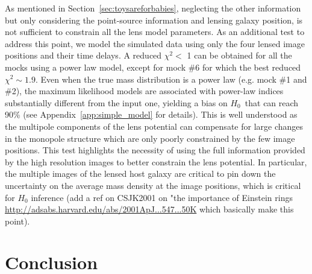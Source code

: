 \documentclass[traditabstract, twocolumns, longauth]{aa}
\newcommand{\Hc}{\ensuremath{H_0}\xspace}
\begin{document}
As mentioned in Section~\ref{sec:toysareforbabies}, neglecting the other information but only considering the point-source information and lensing galaxy position, is not sufficient to constrain all the lens model parameters. As an additional test to address this point, we model the simulated data using only the four lensed image positions and their time delays. A reduced $\chi^2 <$ 1 can be obtained for all the mocks using a power law model, except for mock \#6 for which the best reduced $\chi^2 \sim 1.9$. Even when the true mass distribution is a power law (e.g. mock \#1 and \#2), the maximum likelihood models are associated with power-law indices substantially different from the input one, yielding a bias on \Hc\, that can reach 90\% (see Appendix~\ref{app:simple_model} for details). This is well understood as the multipole components of the lens potential can compensate for large changes in the monopole structure which are only poorly constrained by the few image positions. This test highlights the necessity of using the full information provided by the high resolution images to better constrain the lens potential. In particular, the multiple images of the lensed host galaxy are critical to pin down the uncertainty on the average mass density at the image positions, which is critical for \Hc inference (add a ref on CSJK2001 on "the importance of Einstein rings  \url{http://adsabs.harvard.edu/abs/2001ApJ...547...50K} which basically make this point).

\section{Conclusion}
\label{conclusion}

\begin{acknowledgements}
\end{acknowledgements}


%
\end{document}
